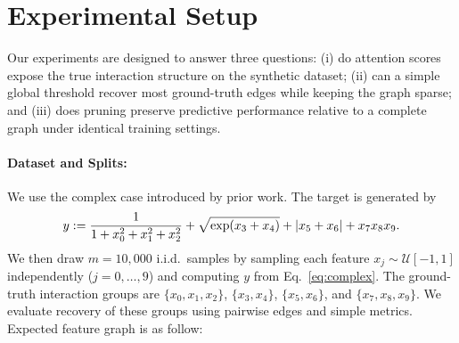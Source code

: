 \documentclass[10pt,a4paper]{article}
\begin{document}
\section{Experimental Setup}
Our experiments are designed to answer three questions: (i) do attention scores expose the true interaction structure on the synthetic dataset; (ii) can a simple global threshold recover most ground-truth edges while keeping the graph sparse; and (iii) does pruning preserve predictive performance relative to a complete graph under identical training settings.

\paragraph{Dataset and Splits:}
We use the complex case introduced by prior work. The target is generated by
\begin{equation}
\label{eq:complex}
\small
 y := \frac{1}{1 + x_0^2 + x_1^2 + x_2^2} + \sqrt{\exp(x_3 + x_4)} + |x_5 + x_6| + x_7 x_8 x_9 .
\end{equation}
We then draw $m=10{,}000$ i.i.d.\ samples by sampling each feature $x_j \sim \mathcal{U}[-1,1]$ independently ($j=0,\ldots,9$) and computing $y$ from Eq.~\eqref{eq:complex}.
The ground-truth interaction groups are $\{x_0,x_1,x_2\}$, $\{x_3,x_4\}$, $\{x_5,x_6\}$, and $\{x_7,x_8,x_9\}$. We evaluate recovery of these groups using pairwise edges and simple metrics. Expected feature graph is as follow:
\end{document}
